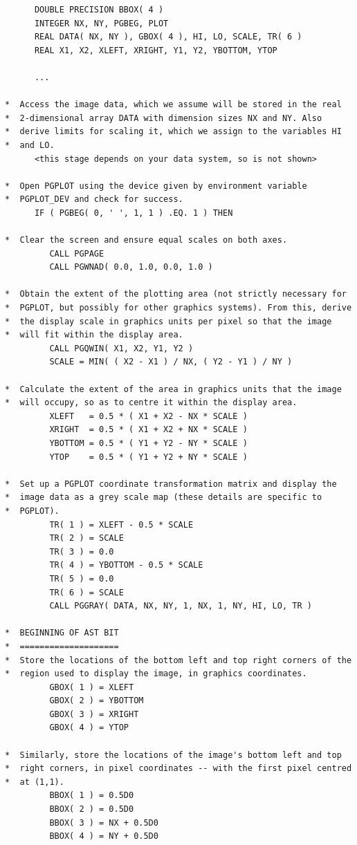\documentclass[twoside,11pt]{article}
\begin{document}
\begin{verbatim}
      DOUBLE PRECISION BBOX( 4 )
      INTEGER NX, NY, PGBEG, PLOT
      REAL DATA( NX, NY ), GBOX( 4 ), HI, LO, SCALE, TR( 6 )
      REAL X1, X2, XLEFT, XRIGHT, Y1, Y2, YBOTTOM, YTOP

      ...

*  Access the image data, which we assume will be stored in the real
*  2-dimensional array DATA with dimension sizes NX and NY. Also
*  derive limits for scaling it, which we assign to the variables HI
*  and LO.
      <this stage depends on your data system, so is not shown>

*  Open PGPLOT using the device given by environment variable
*  PGPLOT_DEV and check for success.
      IF ( PGBEG( 0, ' ', 1, 1 ) .EQ. 1 ) THEN

*  Clear the screen and ensure equal scales on both axes.
         CALL PGPAGE
         CALL PGWNAD( 0.0, 1.0, 0.0, 1.0 )

*  Obtain the extent of the plotting area (not strictly necessary for
*  PGPLOT, but possibly for other graphics systems). From this, derive
*  the display scale in graphics units per pixel so that the image
*  will fit within the display area.
         CALL PGQWIN( X1, X2, Y1, Y2 )
         SCALE = MIN( ( X2 - X1 ) / NX, ( Y2 - Y1 ) / NY )

*  Calculate the extent of the area in graphics units that the image
*  will occupy, so as to centre it within the display area.
         XLEFT   = 0.5 * ( X1 + X2 - NX * SCALE )
         XRIGHT  = 0.5 * ( X1 + X2 + NX * SCALE )
         YBOTTOM = 0.5 * ( Y1 + Y2 - NY * SCALE )
         YTOP    = 0.5 * ( Y1 + Y2 + NY * SCALE )

*  Set up a PGPLOT coordinate transformation matrix and display the
*  image data as a grey scale map (these details are specific to
*  PGPLOT).
         TR( 1 ) = XLEFT - 0.5 * SCALE
         TR( 2 ) = SCALE
         TR( 3 ) = 0.0
         TR( 4 ) = YBOTTOM - 0.5 * SCALE
         TR( 5 ) = 0.0
         TR( 6 ) = SCALE
         CALL PGGRAY( DATA, NX, NY, 1, NX, 1, NY, HI, LO, TR )

*  BEGINNING OF AST BIT
*  ====================
*  Store the locations of the bottom left and top right corners of the
*  region used to display the image, in graphics coordinates.
         GBOX( 1 ) = XLEFT
         GBOX( 2 ) = YBOTTOM
         GBOX( 3 ) = XRIGHT
         GBOX( 4 ) = YTOP

*  Similarly, store the locations of the image's bottom left and top
*  right corners, in pixel coordinates -- with the first pixel centred
*  at (1,1).
         BBOX( 1 ) = 0.5D0
         BBOX( 2 ) = 0.5D0
         BBOX( 3 ) = NX + 0.5D0
         BBOX( 4 ) = NY + 0.5D0


\end{verbatim}
\end{document}
